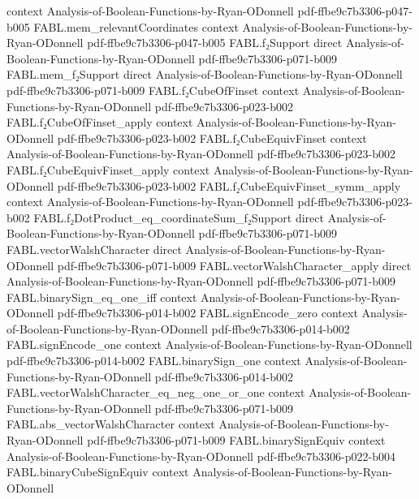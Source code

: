 \begin{theorem}
  {context}
  {Analysis-of-Boolean-Functions-by-Ryan-ODonnell}
  {pdf-ffbe9c7b3306-p047-b005}
\proofstep
  {FABL.mem_relevantCoordinates}
  {context}
  {Analysis-of-Boolean-Functions-by-Ryan-ODonnell}
  {pdf-ffbe9c7b3306-p047-b005}
\proofstep
  {FABL.f₂Support}
  {direct}
  {Analysis-of-Boolean-Functions-by-Ryan-ODonnell}
  {pdf-ffbe9c7b3306-p071-b009}
\proofstep
  {FABL.mem_f₂Support}
  {direct}
  {Analysis-of-Boolean-Functions-by-Ryan-ODonnell}
  {pdf-ffbe9c7b3306-p071-b009}
\proofstep
  {FABL.f₂CubeOfFinset}
  {context}
  {Analysis-of-Boolean-Functions-by-Ryan-ODonnell}
  {pdf-ffbe9c7b3306-p023-b002}
\proofstep
  {FABL.f₂CubeOfFinset_apply}
  {context}
  {Analysis-of-Boolean-Functions-by-Ryan-ODonnell}
  {pdf-ffbe9c7b3306-p023-b002}
\proofstep
  {FABL.f₂CubeEquivFinset}
  {context}
  {Analysis-of-Boolean-Functions-by-Ryan-ODonnell}
  {pdf-ffbe9c7b3306-p023-b002}
\proofstep
  {FABL.f₂CubeEquivFinset_apply}
  {context}
  {Analysis-of-Boolean-Functions-by-Ryan-ODonnell}
  {pdf-ffbe9c7b3306-p023-b002}
\proofstep
  {FABL.f₂CubeEquivFinset_symm_apply}
  {context}
  {Analysis-of-Boolean-Functions-by-Ryan-ODonnell}
  {pdf-ffbe9c7b3306-p023-b002}
\proofstep
  {FABL.f₂DotProduct_eq_coordinateSum_f₂Support}
  {direct}
  {Analysis-of-Boolean-Functions-by-Ryan-ODonnell}
  {pdf-ffbe9c7b3306-p071-b009}
\proofstep
  {FABL.vectorWalshCharacter}
  {direct}
  {Analysis-of-Boolean-Functions-by-Ryan-ODonnell}
  {pdf-ffbe9c7b3306-p071-b009}
\proofstep
  {FABL.vectorWalshCharacter_apply}
  {direct}
  {Analysis-of-Boolean-Functions-by-Ryan-ODonnell}
  {pdf-ffbe9c7b3306-p071-b009}
\proofstep
  {FABL.binarySign_eq_one_iff}
  {context}
  {Analysis-of-Boolean-Functions-by-Ryan-ODonnell}
  {pdf-ffbe9c7b3306-p014-b002}
\proofstep
  {FABL.signEncode_zero}
  {context}
  {Analysis-of-Boolean-Functions-by-Ryan-ODonnell}
  {pdf-ffbe9c7b3306-p014-b002}
\proofstep
  {FABL.signEncode_one}
  {context}
  {Analysis-of-Boolean-Functions-by-Ryan-ODonnell}
  {pdf-ffbe9c7b3306-p014-b002}
\proofstep
  {FABL.binarySign_one}
  {context}
  {Analysis-of-Boolean-Functions-by-Ryan-ODonnell}
  {pdf-ffbe9c7b3306-p014-b002}
\proofstep
  {FABL.vectorWalshCharacter_eq_neg_one_or_one}
  {context}
  {Analysis-of-Boolean-Functions-by-Ryan-ODonnell}
  {pdf-ffbe9c7b3306-p071-b009}
\proofstep
  {FABL.abs_vectorWalshCharacter}
  {context}
  {Analysis-of-Boolean-Functions-by-Ryan-ODonnell}
  {pdf-ffbe9c7b3306-p071-b009}
\proofstep
  {FABL.binarySignEquiv}
  {context}
  {Analysis-of-Boolean-Functions-by-Ryan-ODonnell}
  {pdf-ffbe9c7b3306-p022-b004}
\proofstep
  {FABL.binaryCubeSignEquiv}
  {context}
  {Analysis-of-Boolean-Functions-by-Ryan-ODonnell}

\end{theorem}
